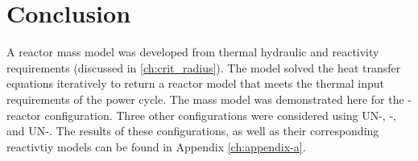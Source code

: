 \section{Conclusion}
A reactor mass model was developed from thermal hydraulic and reactivity
requirements (discussed in \ref{ch:crit_radius}). The model solved the heat
transfer equations iteratively to return a reactor model that meets the thermal
input requirements of the power cycle. The mass model was demonstrated here for
the \uox-\codiox  reactor configuration. Three other configurations were
considered using UN-\codiox, \uox-\water, and UN-\water. The results of these
configurations, as well as their corresponding reactivtiy models can be found in
Appendix \ref{ch:appendix-a}.

